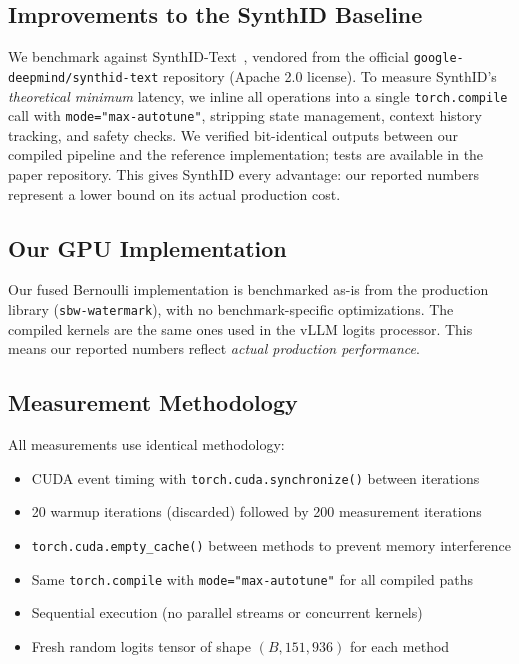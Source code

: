 \documentclass[11pt]{article}
\begin{document}
\subsection{Improvements to the SynthID Baseline}

We benchmark against SynthID-Text~\cite{dathathri2024scalable}, vendored from the official \texttt{google-deepmind/synthid-text} repository (Apache 2.0 license). To measure SynthID's \emph{theoretical minimum} latency, we inline all operations into a single \texttt{torch.compile} call with \texttt{mode="max-autotune"}, stripping state management, context history tracking, and safety checks. We verified bit-identical outputs between our compiled pipeline and the reference implementation; tests are available in the paper repository. This gives SynthID every advantage: our reported numbers represent a lower bound on its actual production cost.

\subsection{Our GPU Implementation}

Our fused Bernoulli implementation is benchmarked as-is from the production library (\texttt{sbw-watermark}), with no benchmark-specific optimizations. The compiled kernels are the same ones used in the vLLM logits processor. This means our reported numbers reflect \emph{actual production performance}.

\subsection{Measurement Methodology}

All measurements use identical methodology:
\begin{itemize}
\item CUDA event timing with \texttt{torch.cuda.synchronize()} between iterations
\item 20 warmup iterations (discarded) followed by 200 measurement iterations
\item \texttt{torch.cuda.empty\_cache()} between methods to prevent memory interference
\item Same \texttt{torch.compile} with \texttt{mode="max-autotune"} for all compiled paths
\item Sequential execution (no parallel streams or concurrent kernels)
\item Fresh random logits tensor of shape $(B, 151{,}936)$ for each method
\end{itemize}
\end{document}
